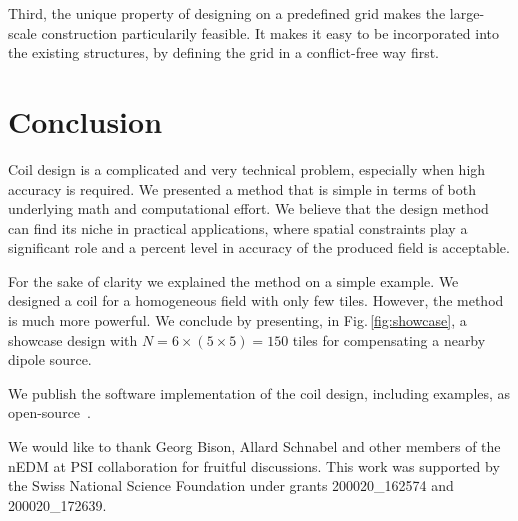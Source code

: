 Third, the unique property of designing on a predefined grid makes the large-scale construction particularily feasible. It makes it easy to be incorporated into the existing structures, by defining the grid in a conflict-free way first.



\section{Conclusion}
Coil design is a complicated and very technical problem, especially when high accuracy is required. We presented a method that is simple in terms of both underlying math and computational effort. We believe that the design method can find its niche in practical applications, where spatial constraints play a significant role and a percent level in accuracy of the produced field is acceptable.

For the sake of clarity we explained the method on a simple example. We designed a coil for a homogeneous field with only few tiles. However, the method is much more powerful. We conclude by presenting, in Fig.\,\ref{fig:showcase}, a showcase design with $N = 6 \times (5 \times 5) = 150$ tiles for compensating a nearby dipole source.

We publish the software implementation of the coil design, including examples, as open-source~\cite{Coilsjlcode}.

We would like to thank Georg Bison, Allard Schnabel and other members of the nEDM at PSI collaboration for fruitful discussions. This work was supported by the Swiss National Science Foundation under grants 200020\_162574 and 200020\_172639.

